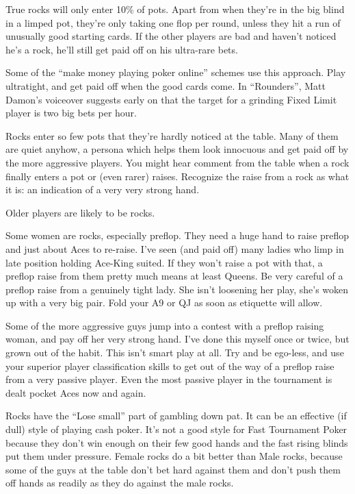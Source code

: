 True rocks will only enter 10\% of pots. Apart from when they're
in the big blind in a limped pot, they're only taking one
flop per round, unless they hit a run of unusually good starting
cards. If the other players are bad and haven't noticed
he's a rock, he'll still get paid off on his ultra-rare bets.

Some of the ``make money playing poker online'' schemes use this
approach. Play ultratight, and get paid off when the good cards
come. In ``Rounders'', Matt Damon's voiceover suggests early on that
the target for a grinding Fixed Limit player is two big bets per
hour.

Rocks enter so few pots that they're hardly noticed
at the table. Many of them are quiet anyhow,
a persona which helps them look innocuous and get paid off by the
more aggressive players. You might hear comment from the table
when a rock finally enters a pot or (even rarer) raises. Recognize
the raise from a rock as what it is: an indication of a very very
strong hand.

Older players are likely to be rocks.

Some women are rocks, especially preflop. They
need a huge hand to raise preflop and just about Aces to
re-raise. I've seen (and paid off) many ladies who limp in late
position holding Ace-King suited. If they won't raise a pot with that,
a preflop raise from them pretty much means at least Queens. Be very
careful of a preflop raise from a genuinely tight lady. She isn't
loosening her play, she's woken up with a very
big pair. Fold your A9 or QJ as soon as etiquette will allow.

Some of the more aggressive guys jump into a contest with a
preflop raising woman, and pay off her very strong hand. I've
done this myself once or twice, but grown out of the habit. This
isn't smart play at all. Try and be ego-less, and use your
superior player classification skills to get out of the way
of a preflop raise from a very passive player. Even the most
passive player in the tournament is dealt pocket Aces now and
again.

Rocks have the ``Lose small'' part of gambling down pat. It can
be an effective (if dull) style of playing cash poker. It's not a
good style for Fast Tournament Poker because they don't win enough
on their few good hands and the fast rising blinds put them
under pressure. Female rocks do a bit better than Male rocks, because
some of the guys at the table don't bet hard against them and don't
push them off hands as readily as they do against the male rocks.

